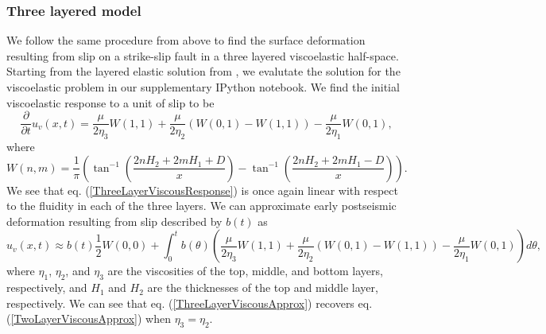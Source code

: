\documentclass[extra]{gji}
\begin{document}
\subsubsection{Three layered model}
We follow the same procedure from above to find the surface
deformation resulting from slip on a strike-slip fault in a three
layered viscoelastic half-space.  Starting from the layered elastic
solution from \citet{CJ1972}, we evalutate the solution for the
viscoelastic problem in our supplementary IPython notebook.  We find
the initial viscoelastic response to a unit of slip to be
\begin{equation}\label{ThreeLayerViscousResponse}
\frac{\partial}{\partial t}u_v(x,t) = \frac{\mu}{2\eta_3}W(1,1)
                                      +\frac{\mu}{2\eta_2}(W(0,1) - W(1,1))
                                      -\frac{\mu}{2\eta_1}W(0,1),
\end{equation}
where
\begin{equation}
  W(n,m) = \frac{1}{\pi}\left(\tan^{-1}\left(\frac{2nH_2 + 2mH_1 + D}{x}\right) - 
                              \tan^{-1}\left(\frac{2nH_2 + 2mH_1 - D}{x}\right)\right).
\end{equation}
We see that eq. (\ref{ThreeLayerViscousResponse}) is once again linear
with respect to the fluidity in each of the three layers.  We can
approximate early postseismic deformation resulting from slip
described by $b(t)$ as
\begin{equation}\label{ThreeLayerViscousApprox}
u_v(x,t) \approx b(t)\frac{1}{2} W(0,0) + 
         \int_0^tb(\theta)\left(\frac{\mu}{2\eta_3}W(1,1)
                               +\frac{\mu}{2\eta_2}(W(0,1) - W(1,1))
                               -\frac{\mu}{2\eta_1}W(0,1)\right)d\theta,
\end{equation}
where $\eta_1$, $\eta_2$, and $\eta_3$ are the viscosities of the top,
middle, and bottom layers, respectively, and $H_1$ and $H_2$ are the
thicknesses of the top and middle layer, respectively.  We can see
that eq. (\ref{ThreeLayerViscousApprox}) recovers eq.
(\ref{TwoLayerViscousApprox}) when $\eta_3 = \eta_2$.

\end{document}

